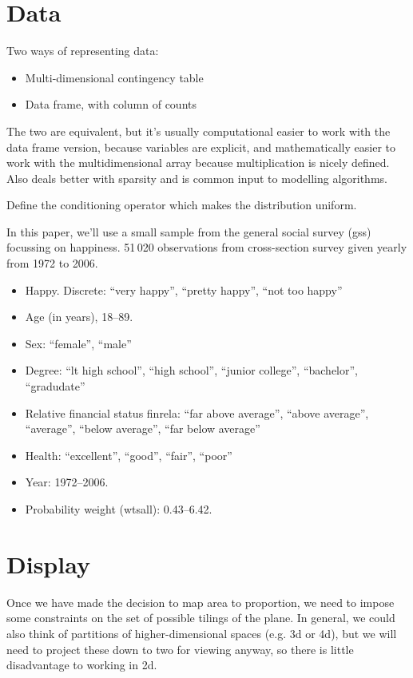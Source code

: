 \documentclass[letterpaper,oneside]{scrartcl}
\begin{document}
\section{Data}
\label{sec:data}

Two ways of representing data:

\begin{itemize}
  \item Multi-dimensional contingency table
  \item Data frame, with column of counts
\end{itemize}

The two are equivalent, but it's usually computational easier to work with the data frame version, because variables are explicit, and mathematically easier to work with the multidimensional array because multiplication is nicely defined.  Also deals better with sparsity and is common input to modelling algorithms.

Define the conditioning operator which makes the distribution uniform.  

In this paper, we'll use a small sample from the general social survey ({\sc gss}) focussing on happiness. 51\,020 observations from cross-section survey given yearly from 1972 to 2006.

\begin{itemize}
  \item Happy.  Discrete: ``very happy'', ``pretty happy'', ``not too happy''
  \item Age (in years), 18--89.
  \item Sex: ``female'', ``male''
  \item Degree: ``lt high school'', ``high school'', ``junior college'', ``bachelor'', ``gradudate''
  \item Relative financial status {\sf finrela}: ``far above average'', ``above average'', ``average'', ``below average'', ``far below average''
  \item Health: ``excellent'', ``good'', ``fair'', ``poor''
  \item Year: 1972--2006.
  \item Probability weight ({\sf wtsall}): 0.43--6.42.
\end{itemize}


\section{Display}
\label{sec:display}

Once we have made the decision to map area to proportion, we need to impose some constraints on the set of possible tilings of the plane. In general, we could also think of partitions of higher-dimensional spaces (e.g. 3d or 4d), but we will need to project these down to two for viewing anyway, so there is little disadvantage to working in 2d.
\end{document}
